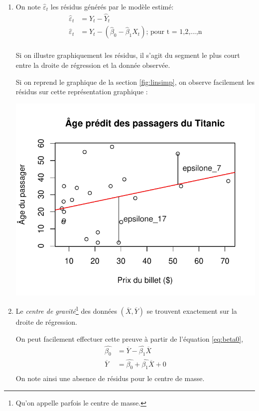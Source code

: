 \documentclass[11pt,french]{report}
\begin{document}
\begin{enumerate}
\item On note $\hat{\varepsilon}_t$ les résidus générés par le modèle estimé:
\begin{align*}
\hat{\varepsilon}_t &= Y_t - \hat{Y}_t \\
\hat{\varepsilon}_t &= Y_t - (\hat{\beta}_0 - \hat{\beta}_1 X_t) \text{; pour t = 1,2,...,n} \\
\end{align*}

Si on illustre graphiquement les résidus, il s'agit du segment le plus court entre la droite de régression et la donnée observée. 

\bigskip
Si on reprend le graphique de la section \ref{fig:linsimp}, on observe facilement les résidus sur cette représentation graphique :

\includegraphics{notes_de_cours-007}

\item Le \emph{centre de gravité}\footnote{Qu'on appelle parfois le centre de masse.} des données $(\overline{X}, \overline{Y})$ se trouvent exactement sur la droite de régression.

On peut facilement effectuer cette preuve à partir de l'équation \ref{eq:beta0},
\begin{align*}
\hat{\beta_0} &= \overline{Y} - \hat{\beta_1} \overline{X} \\
\overline{Y} &=  \hat{\beta_0} + \hat{\beta_1} \overline{X} + 0 \\
\end{align*}
On note ainsi une absence de résidus pour le centre de masse.


\end{enumerate}
\end{document}
